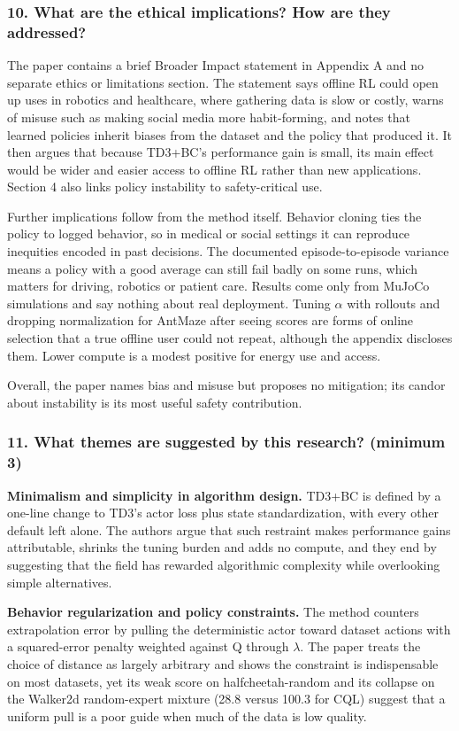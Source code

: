 \documentclass[11pt]{article}
\newcommand{\question}[1]{\subsubsection*{#1}}
\begin{document}
\question{10. What are the ethical implications? How are they addressed?}

The paper contains a brief Broader Impact statement in Appendix A and no separate ethics or limitations section. The statement says offline RL could open up uses in robotics and healthcare, where gathering data is slow or costly, warns of misuse such as making social media more habit-forming, and notes that learned policies inherit biases from the dataset and the policy that produced it. It then argues that because TD3+BC's performance gain is small, its main effect would be wider and easier access to offline RL rather than new applications. Section 4 also links policy instability to safety-critical use.

Further implications follow from the method itself. Behavior cloning ties the policy to logged behavior, so in medical or social settings it can reproduce inequities encoded in past decisions. The documented episode-to-episode variance means a policy with a good average can still fail badly on some runs, which matters for driving, robotics or patient care. Results come only from MuJoCo simulations and say nothing about real deployment. Tuning \ensuremath{\alpha} with rollouts and dropping normalization for AntMaze after seeing scores are forms of online selection that a true offline user could not repeat, although the appendix discloses them. Lower compute is a modest positive for energy use and access.

Overall, the paper names bias and misuse but proposes no mitigation; its candor about instability is its most useful safety contribution.

\question{11. What themes are suggested by this research? (minimum 3)}

\textbf{Minimalism and simplicity in algorithm design.} TD3+BC is defined by a one-line change to TD3's actor loss plus state standardization, with every other default left alone. The authors argue that such restraint makes performance gains attributable, shrinks the tuning burden and adds no compute, and they end by suggesting that the field has rewarded algorithmic complexity while overlooking simple alternatives.

\textbf{Behavior regularization and policy constraints.} The method counters extrapolation error by pulling the deterministic actor toward dataset actions with a squared-error penalty weighted against Q through \ensuremath{\lambda}. The paper treats the choice of distance as largely arbitrary and shows the constraint is indispensable on most datasets, yet its weak score on halfcheetah-random and its collapse on the Walker2d random-expert mixture (28.8 versus 100.3 for CQL) suggest that a uniform pull is a poor guide when much of the data is low quality.
\end{document}
